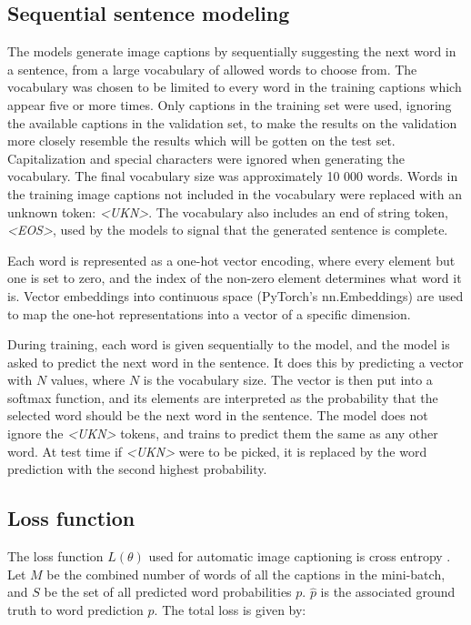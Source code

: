 \documentclass[a4paper, twoside]{article}
\begin{document}
\subsection{Sequential sentence modeling}
The models generate image captions by sequentially suggesting the next word in a sentence, from a large vocabulary of allowed words to choose from. The vocabulary was chosen to be limited to every word in the training captions which appear five or more times. Only captions in the training set were used, ignoring the available captions in the validation set, to make the results on the validation more closely resemble the results which will be gotten on the test set. Capitalization and special characters were ignored when generating the vocabulary. The final vocabulary size was approximately 10 000 words. Words in the training image captions not included in the vocabulary were replaced with an unknown token: \textit{<UKN>}. The vocabulary also includes an end of string token, \textit{<EOS>}, used by the models to signal that the generated sentence is complete.

Each word is represented as a one-hot vector encoding, where every element but one is set to zero, and the index of the non-zero element determines what word it is. Vector embeddings into continuous space (PyTorch's nn.Embeddings) \cite{pytorch} are used to map the one-hot representations into a vector of a specific dimension.

During training, each word is given sequentially to the model, and the model is asked to predict the next word in the sentence. It does this by predicting a vector with $N$ values, where $N$ is the vocabulary size. The vector is then put into a softmax function, and its elements are interpreted as the probability that the selected word should be the next word in the sentence. The model does not ignore the \textit{<UKN>} tokens, and trains to predict them the same as any other word. At test time if \textit{<UKN>} were to be picked, it is replaced by the word prediction with the second highest probability.

\subsection{Loss function}
The loss function $L(\theta)$ used for automatic image captioning is cross entropy \cite{notesonbackprop}. Let $M$ be the combined number of words of all the captions in the mini-batch, and $S$ be the set of all predicted word probabilities $p$. $\hat{p}$ is the associated ground truth to word prediction $p$. The total loss is given by:
\end{document}

